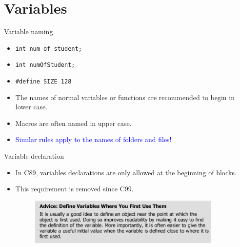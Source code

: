 \documentclass[handout]{beamer}
\newcommand{\blue}[1]{\textcolor{blue}{#1}}
\newcommand{\ttt}[1]{\texttt{#1}}
\begin{document}
\section{Variables}

\begin{frame}{Variable naming}
    \begin{itemize}
        \item \ttt{int num\_of\_student;}
        \item \ttt{int numOfStudent;}
        \item \ttt{\#define SIZE 128}
        \pause
        \item The names of normal variables or functions are recommended to begin in lower case.
        \item Macros are often named in upper case.
        \pause
        \item \blue{Similar rules apply to the names of folders and files!}
    \end{itemize}
\end{frame}

\begin{frame}{Variable declaration}
    \begin{itemize}
        \item In C89, variables declarations are only allowed at the beginning of blocks.
        \item This requirement is removed since C99.
        \begin{figure}[h]
            \centering
            \includegraphics[width=0.9\textwidth]{figures/advice-variables.png}
        \end{figure}
    \end{itemize}
\end{frame}
\end{document}

